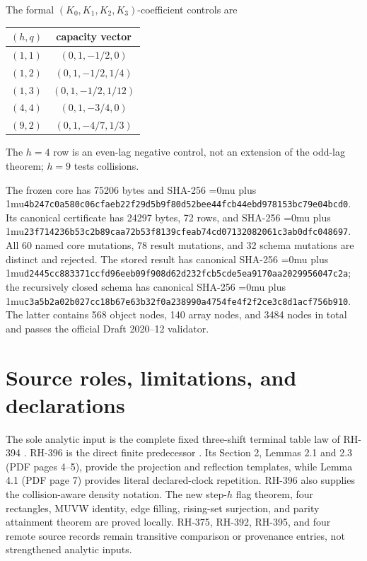 \documentclass[11pt]{article}
\theoremstyle{definition}
\theoremstyle{remark}
\newcommand{\artifacthash}[1]{\begingroup\Urlmuskip=0mu plus 1mu\relax\nolinkurl{#1}\endgroup}
\begin{document}
The formal \((K_0,K_1,K_2,K_3)\)-coefficient controls are
\begin{center}
\begin{tabular}{c@{\quad}c}
\toprule
\((h,q)\)&capacity vector\\
\midrule
\((1,1)\)&\((0,1,-1/2,0)\)\\
\((1,2)\)&\((0,1,-1/2,1/4)\)\\
\((1,3)\)&\((0,1,-1/2,1/12)\)\\
\((4,4)\)&\((0,1,-3/4,0)\)\\
\((9,2)\)&\((0,1,-4/7,1/3)\)\\
\bottomrule
\end{tabular}
\label{tab:exact-controls}
\end{center}
The \(h=4\) row is an even-lag negative control, not an extension of the
odd-lag theorem; \(h=9\) tests collisions.

The frozen core has 75206 bytes and SHA-256
\artifacthash{4b247c0a580c06cfaeb22f29d5b9f80d52bee44fcb44ebd978153bc79e04bcd0}.
Its canonical certificate has 24297 bytes, 72 rows, and SHA-256
\artifacthash{23f714236b53c2b89caa72b53f8139cfeab74cd07132082061c3ab0dfc048697}.
All 60 named core mutations, 78 result mutations, and 32 schema mutations
are distinct and rejected.  The stored result has canonical SHA-256
\artifacthash{d2445cc883371ccfd96eeb09f908d62d232fcb5cde5ea9170aa2029956047c2a};
the recursively closed schema has canonical SHA-256
\artifacthash{c3a5b2a02b027cc18b67e63b32f0a238990a4754fe4f2f2ce3c8d1acf756b910}.
The latter contains 568 object nodes, 140 array nodes, and 3484 nodes in
total and passes the official Draft 2020--12 validator.

\section{Source roles, limitations, and declarations}

The sole analytic input is the complete fixed three-shift terminal table law
of RH-394 \cite{RH394}.  RH-396 is the direct finite predecessor
\cite{RH396}.  Its Section 2, Lemmas 2.1 and 2.3 (PDF pages 4--5), provide
the projection and reflection templates, while Lemma 4.1 (PDF page 7)
provides literal declared-clock repetition.  RH-396 also supplies the
collision-aware density notation.  The new
step-\(h\) flag theorem, four rectangles, MUVW identity, edge filling,
rising-set surjection, and parity attainment theorem are proved locally.
RH-375, RH-392, RH-395, and four remote source records remain transitive
comparison or provenance entries, not strengthened analytic inputs.
\end{document}
